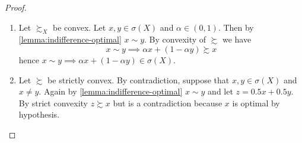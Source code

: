 \documentclass[12pt]{extarticle}
\begin{document}
\begin{proof}
    \skiplineafterproof
    \begin{enumerate}[label=\roman*.]
        \item Let $\succsim_X$ be convex.
              Let $x, y \in \sigma (X)$ and $\alpha \in (0,1)$. Then by \cref{lemma:indifference-optimal} $x \sim y$.
              By convexity of $\succsim$ we have
              \begin{equation}
                  x \sim y \implies \alpha x + (1- \alpha y) \succsim x
              \end{equation}
              hence
              $x \sim y \implies \alpha x + (1- \alpha y) \in \sigma(X)$.

        \item Let $\succsim$ be strictly convex.
              By contradiction, suppose that $x, y \in \sigma(X)$ and $x \neq y$.
              Again by \cref{lemma:indifference-optimal} $x \sim y$ and let $z = 0.5 x + 0.5 y$.
              By strict convexity $z \succsim x$ but is a contradiction because $x$ is optimal by hypothesis.
    \end{enumerate}
\end{proof}
\end{document}
